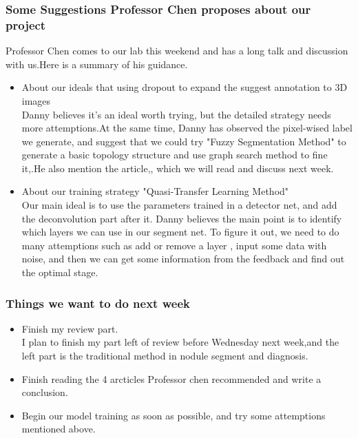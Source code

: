 \documentclass[8pt]{beamer}
\begin{document}
\begin{frame}[fragile]
\frametitle{Some Suggestions Professor Chen proposes about our project}
\indent
Professor Chen comes to our lab this weekend and has a long talk and discussion with us.Here is a summary of his guidance.
\begin{itemize}
\item About our ideals that using dropout to expand the suggest annotation to 3D images\\
\vspace{.3cm}
Danny believes it's an ideal worth trying, but the detailed strategy needs more attemptions.At the same time, Danny has observed the pixel-wised label we generate, and suggest that we could try "Fuzzy Segmentation Method" to generate a basic topology structure and use graph search method to fine it\cite{li2006optimal},\cite{6328283}.He also mention the article\cite{Yu2017},\cite{Dou20173D}, which we will read and discuss next week.
\item About our training strategy "Quasi-Transfer Learning Method"\\
\vspace{.3cm}
Our main ideal is to use the parameters trained in a detector net, and add the deconvolution part after it. Danny believes the main point is to identify which layers we can use in our segment net. To figure it out, we need to do many attemptions such as add or remove a layer , input some data with noise, and then we can get some information from the feedback and find out the optimal stage. 

\end{itemize}
\end{frame}

\begin{frame}[fragile]
\frametitle{ Things we want to do next week}
\vspace{.3cm}
\begin{itemize}
	\item Finish my review part.\\
	\vspace{.3cm}
	I plan to finish my part left of review before Wednesday next week,and the left part is the traditional method in nodule segment and diagnosis. 
	\vspace{.3cm}
	\item Finish reading the 4 arcticles Professor chen recommended and write a conclusion.
	\vspace{.3cm}
	\item Begin our model training as soon as possible, and try some attemptions mentioned above.

\end{itemize}
\end{frame}




\end{document}
